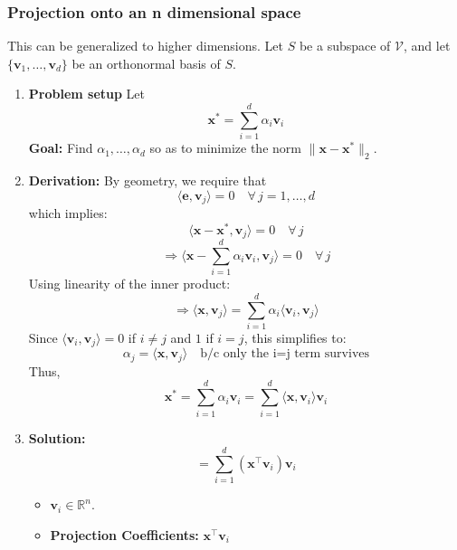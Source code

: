     \subsubsection{Projection onto an n dimensional space}
        \begin{example}
        This can be generalized to higher dimensions. Let \( S \) be a subspace of \( \mathcal{V} \), and let \( \{ \mathbf{v}_1, \dots, \mathbf{v}_d \} \) be an orthonormal basis of \( S \).
        \begin{enumerate}
            \item \textbf{Problem setup}
            Let 
            \[
            \mathbf{x}^* = \sum_{i=1}^{d} \alpha_i \mathbf{v}_i
            \]
            \textbf{Goal:} Find \( \alpha_1, \dots, \alpha_d \) so as to minimize the norm \( \|\mathbf{x} - \mathbf{x}^*\|_2 \).

            \item \textbf{Derivation:}
            By geometry, we require that 
            \[
            \langle \mathbf{e}, \mathbf{v}_j \rangle = 0 \quad \forall \, j = 1, \dots, d
            \]
            which implies:
            \[
            \langle \mathbf{x} - \mathbf{x}^*, \mathbf{v}_j \rangle = 0 \quad \forall \, j
            \]
            \[
            \Rightarrow \langle \mathbf{x} - \sum_{i=1}^{d} \alpha_i \mathbf{v}_i, \mathbf{v}_j \rangle = 0 \quad \forall \, j
            \]
            Using linearity of the inner product:
            \[
            \Rightarrow \langle \mathbf{x}, \mathbf{v}_j \rangle = \sum_{i=1}^{d} \alpha_i \langle \mathbf{v}_i, \mathbf{v}_j \rangle
            \]
            Since \( \langle \mathbf{v}_i, \mathbf{v}_j \rangle = 0 \) if \( i \neq j \) and \( 1 \) if \( i = j \), this simplifies to:
            \[
            \alpha_j = \langle \mathbf{x}, \mathbf{v}_j \rangle \quad \text{b/c only the i=j term survives}
            \]
            Thus,
            \[
            \mathbf{x}^* = \sum_{i=1}^{d} \alpha_i \mathbf{v}_i = \sum_{i=1}^{d} \langle \mathbf{x}, \mathbf{v}_i \rangle \mathbf{v}_i
            \]

            \item \textbf{Solution:}
            \[
            = \sum_{i=1}^{d} (\mathbf{x}^\top \mathbf{v}_i) \mathbf{v}_i
            \]
            \begin{itemize}
                \item \( \mathbf{v}_i \in \mathbb{R}^n \).
                \item \textbf{Projection Coefficients:} $\mathbf{x}^\top \mathbf{v}_i$
            \end{itemize}


\end{enumerate}
\end{example}
